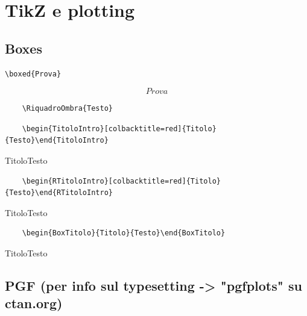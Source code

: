 \chapter{TikZ e plotting}
\section{Boxes}
\begin{verbatim}
\boxed{Prova}
\end{verbatim}
$$\boxed{Prova}$$

\begin{verbatim}
	\RiquadroOmbra{Testo}
\end{verbatim}

\begin{verbatim}
	\begin{TitoloIntro}[colbacktitle=red]{Titolo}{Testo}\end{TitoloIntro}
\end{verbatim}
\begin{TitoloIntro}[colbacktitle=red, width=\textwidth]{Titolo}{Testo}\end{TitoloIntro}

\begin{verbatim}
	\begin{RTitoloIntro}[colbacktitle=red]{Titolo}{Testo}\end{RTitoloIntro}
\end{verbatim}
\begin{RTitoloIntro}[colbacktitle=red]{Titolo}{Testo}\end{RTitoloIntro}

\begin{verbatim}
	\begin{BoxTitolo}{Titolo}{Testo}\end{BoxTitolo}
\end{verbatim}
\begin{BoxTitolo}{Titolo}{Testo}\end{BoxTitolo}

\newpage
\section{PGF (per info sul typesetting -> "pgfplots" su ctan.org)}
\begin{center}
\end{center}
\vspace{2cm}

